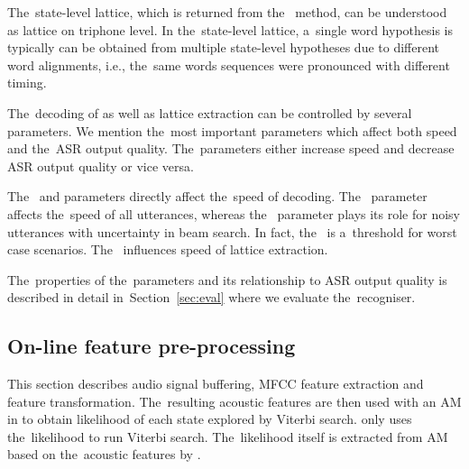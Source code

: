 The~state-level lattice, which is returned from the~ method, can be understood as lattice on triphone level.
In the~state-level lattice, a~single word hypothesis is typically can be obtained from multiple state-level hypotheses due to different word alignments, i.e., the~same words sequences were pronounced with different timing.

The~decoding of  as well as lattice extraction can be controlled by several parameters.
We mention the~most important parameters which affect both speed and the~\ac{ASR} output quality. 
The~parameters either increase speed and decrease \ac{ASR} output quality or vice versa.

The~ and  parameters directly affect the~speed of decoding. 
The~ parameter affects the~speed of all utterances, whereas the~ parameter plays its role for noisy utterances with uncertainty in beam search.
In fact, the~ is a~threshold for worst case scenarios.
The~ influences speed of lattice extraction. 

The~properties of the~parameters and its relationship to \ac{ASR} output quality is described in detail in~Section~\ref{sec:eval} where we evaluate the~recogniser. 

\subsection{On-line feature pre-processing} 
\label{sub:preprocess}
This section describes audio signal buffering, \ac{MFCC} feature extraction and feature transformation. 
The~resulting acoustic features are then used with an \ac{AM} in  to obtain likelihood of each state explored by Viterbi search.
 only uses the~likelihood to run Viterbi search.
The~likelihood itself is extracted from \ac{AM} based on the~acoustic features by . 

